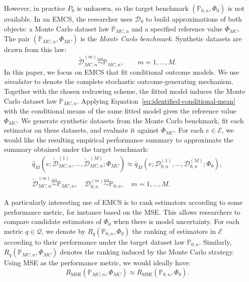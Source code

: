 However, in practice \(P_0\) is unknown, so the target benchmark \((\mathbb P_{0,n},\Phi_0)\) is not available. In an EMCS, the researcher uses \(\mathcal D_0\) to build approximations of both objects: a Monte Carlo dataset law \(\mathbb P_{MC,n}\) and a specified reference value \(\Phi_{MC}\). The pair \((\mathbb P_{MC,n},\Phi_{MC})\) is the \emph{Monte Carlo benchmark}. Synthetic datasets are drawn from this law:
\begin{equation}
\widetilde{\mathcal D}_{MC,n}^{(m)}
\overset{\mathrm{iid}}{\sim}\mathbb P_{MC,n},
\qquad m=1,\dots,M.
\label{eq:synthetic-dataset-draws}
\end{equation}
In this paper, we focus on EMCS that fit conditional outcome models. We use \emph{simulator} to denote the complete stochastic outcome-generating mechanism. Together with the chosen redrawing scheme, the fitted model induces the Monte Carlo dataset law \(\mathbb P_{MC,n}\). Applying Equation~\eqref{eq:identified-conditional-mean} with the conditional means of the same fitted model gives the reference value \(\Phi_{MC}\). We generate synthetic datasets from the Monte Carlo benchmark, fit each estimator on these datasets, and evaluate it against \(\Phi_{MC}\). For each \(e\in\mathcal E\), we would like the resulting empirical performance summary to approximate the summary obtained under the target benchmark:
\begin{equation}
\begin{gathered}
\widehat q_M(e;\widetilde{\mathcal D}_{MC,n}^{(1)},\ldots,\widetilde{\mathcal D}_{MC,n}^{(M)};\Phi_{MC})
\approx\widehat q_M(e;\mathcal D_{0,n}^{(1)},\ldots,\mathcal D_{0,n}^{(M)};\Phi_0),\\
\widetilde{\mathcal D}_{MC,n}^{(m)}\overset{\mathrm{iid}}{\sim}\mathbb P_{MC,n},
\quad
\mathcal D_{0,n}^{(m)}\overset{\mathrm{iid}}{\sim}\mathbb P_{0,n},
\quad m=1,\dots,M.
\end{gathered}
\label{eq:performance-fidelity}
\end{equation}

A particularly interesting use of EMCS is to rank estimators according to some performance metric, for instance based on the MSE. This allows researchers to compare candidate estimators of \(\Phi_0\) when there is model uncertainty. For each metric \(q\in\mathcal Q\), we denote by \(R_q(\mathbb P_{0,n},\Phi_0)\) the ranking of estimators in \(\mathcal E\) according to their performance under the target dataset law \(\mathbb P_{0,n}\). Similarly, \(R_q(\mathbb P_{MC,n},\Phi_{MC})\) denotes the ranking induced by the Monte Carlo strategy. Using MSE as the performance metric, we would ideally have:
\begin{equation}
R_{\mathrm{MSE}}(\mathbb P_{MC,n},\Phi_{MC})
\approx
R_{\mathrm{MSE}}(\mathbb P_{0,n},\Phi_0).
\label{eq:ranking-preservation}
\end{equation}


